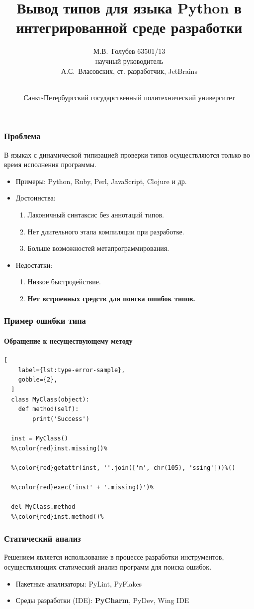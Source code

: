 \documentclass{beamer}
\title[Вывод типов для Python в IDE]{ Вывод типов для языка Python в интегрированной среде разработки }
\author[М.В.~Голубев]{%
  М.В.~Голубев 63501/13 \\ \vspace{.10cm} 
  {\small научный руководитель} \\ \vspace{.10cm} А.С.~Власовских, ст. разработчик, JetBrains
}
\institute[СПбГПУ]{
  \normalsize
  Направление: 230100 --- Информатика и вычислительная техника \\

  Магистерская программа: 230100.68.15 --- Технологии проектирования системного и
  прикладного программного обеспеченияй
}
\date[20.06.2014]{%
  \\ \vspace{1cm}
  \footnotesize Санкт-Петербургский государственный политехнический университет
}
\begin{document}
\frame{\titlepage}

\begin{frame}
  \frametitle{Проблема}

  В языках с динамической типизацией проверки типов осуществляются только во время исполнения программы.
  \begin{itemize}
      \item Примеры: Python, Ruby, Perl, JavaScript, Clojure и др.
      \item Достоинства:
        \begin{enumerate}
            \item Лаконичный синтаксис без аннотаций типов.
            \item Нет длительного этапа компиляции при разработке.
            \item Больше возможностей метапрограммирования.
        \end{enumerate}
      \item Недостатки:
        \begin{enumerate}
            \item Низкое быстродействие.
            \item \textbf{Нет встроенных средств для поиска ошибок типов.}
        \end{enumerate}
  \end{itemize}
    
\end{frame}


\begin{frame}[fragile]
  \frametitle{Пример ошибки типа}
  \framesubtitle{Обращение к несуществующему методу}

  \begin{lstlisting}[
    label={lst:type-error-sample},
    gobble={2},
  ]
  class MyClass(object):
    def method(self):
        print('Success')

  inst = MyClass()
  %\color{red}inst.missing()%

  %\color{red}getattr(inst, ''.join(['m', chr(105), 'ssing']))%()

  %\color{red}exec('inst' + '.missing()')%
  
  del MyClass.method
  %\color{red}inst.method()%

  \end{lstlisting}
    
\end{frame}

\begin{frame}
  \frametitle{Статический анализ}

  Решением является использование в процессе разработки инструментов,
  осуществляющих статический анализ программ для поиска ошибок.

  \begin{itemize}
      \item Пакетные анализаторы: PyLint, PyFlakes
      \item Среды разработки (IDE): \textbf{PyCharm}, PyDev, Wing IDE
  \end{itemize}
    
\end{frame}
\end{document}
